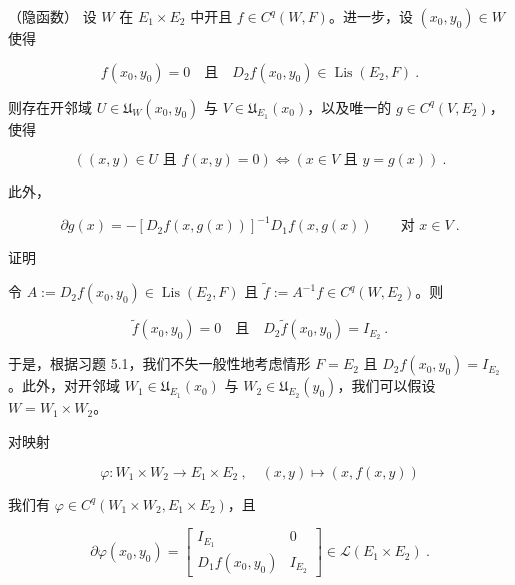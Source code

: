 \begin{theorem}

（隐函数） 设 $ W $ 在 $ E_{1}\times E_{2} $ 中开且 $ f\in C^{q}(W,F) $。进一步，设 $ (x_{0},y_{0})\in W $ 使得

\[
f(x_{0},y_{0})=0\quad\text{且}\quad D_{2}f(x_{0},y_{0})\in\operatorname{Lis}(E_{2},F) \ .
\]

则存在开邻域 $ U\in\mathfrak{U}_{W}(x_{0},y_{0}) $ 与 $ V\in\mathfrak{U}_{E_{1}}(x_{0}) $，以及唯一的 $ g\in C^{q}(V,E_{2}) $，使得

\begin{equation}
\left((x,y)\in U\text{ 且 }f(x,y)=0\right)\iff\left(x\in V\text{ 且 }y=g(x)\right) \ .\tag{8.1}
\end{equation}

此外，

\begin{equation}
\partial g(x)=-\left[D_{2}f(x,g(x))\right]^{-1}D_{1}f(x,g(x))\qquad\text{对 }x\in V \ .\tag{8.2}
\end{equation}

证明

\begin{subitems}
\item

令 $ A:=D_{2}f(x_{0},y_{0})\in\operatorname{Lis}(E_{2},F) $ 且 $ \widetilde{f}:=A^{-1}f\in C^{q}(W,E_{2}) $。则

\[
\widetilde{f}(x_{0},y_{0})=0\quad\text{且}\quad D_{2}\widetilde{f}(x_{0},y_{0})=I_{E_{2}} \ .
\]

于是，根据习题 5.1，我们不失一般性地考虑情形 $ F=E_{2} $ 且 $ D_{2}f(x_{0},y_{0})=I_{E_{2}} $。此外，对开邻域 $ W_{1}\in\mathfrak{U}_{E_{1}}(x_{0}) $ 与 $ W_{2}\in\mathfrak{U}_{E_{2}}(y_{0}) $，我们可以假设 $ W=W_{1}\times W_{2} $。

\item

对映射

\[
\varphi:W_{1}\times W_{2}\to E_{1}\times E_{2}\ ,\quad(x,y)\mapsto(x,f(x,y))
\]

我们有 $ \varphi\in C^{q}(W_{1}\times W_{2},E_{1}\times E_{2}) $，且

\begin{equation*}
\partial\varphi(x_{0},y_{0})=\begin{bmatrix}I_{E_{1}} & 0\\ D_{1}f(x_{0},y_{0}) & I_{E_{2}}\end{bmatrix}\in\mathcal{L}(E_{1}\times E_{2}) \ .
\end{equation*}


\end{subitems}
\end{theorem}
